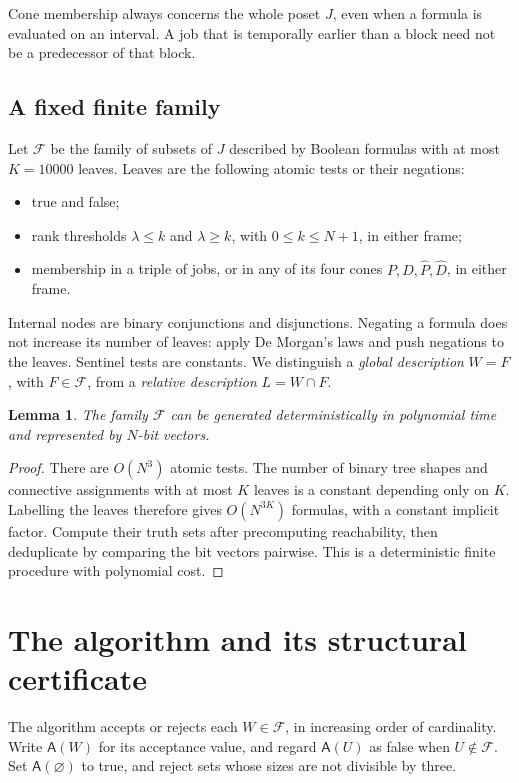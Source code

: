 \documentclass[11pt]{article}
\numberwithin{equation}{section}
\newtheorem{lemma}[theorem]{Lemma}
\theoremstyle{definition}
\theoremstyle{remark}
\newcommand{\F}{\mathcal F}
\newcommand{\rk}{\lambda}
\newcommand{\A}{\mathsf A}
\begin{document}
Cone membership always concerns the whole poset \(J\), even when a formula
is evaluated on an interval. A job that is temporally earlier than a block
need not be a predecessor of that block.

\subsection{A fixed finite family}

Let \(\F\) be the family of subsets of \(J\) described by Boolean formulas
with at most \(K=10000\) leaves. Leaves are the following atomic tests or
their negations:
\begin{itemize}
 \item true and false;
 \item rank thresholds \(\rk\le k\) and \(\rk\ge k\), with
 \(0\le k\le N+1\), in either frame;
 \item membership in a triple of jobs, or in any of its four cones
 \(P,D,\widehat P,\widehat D\), in either frame.
\end{itemize}
Internal nodes are binary conjunctions and disjunctions. Negating a formula
does not increase its number of leaves: apply De Morgan's laws and push
negations to the leaves. Sentinel tests are constants.
We distinguish a \emph{global description} \(W=F\), with \(F\in\F\),
from a \emph{relative description} \(L=W\cap F\).

\begin{lemma}\label{lem:family}
The family \(\F\) can be generated deterministically in polynomial time
and represented by \(N\)-bit vectors.
\end{lemma}
\begin{proof}
There are \(O(N^3)\) atomic tests. The number of binary tree shapes and
connective assignments with at most \(K\) leaves is a constant depending
only on \(K\). Labelling the leaves therefore gives \(O(N^{3K})\)
formulas, with a constant implicit factor. Compute their truth sets after
precomputing reachability, then deduplicate by comparing the bit vectors
pairwise. This is a deterministic finite procedure with polynomial cost.
\end{proof}

\section{The algorithm and its structural certificate}\label{sec:algorithm}

The algorithm accepts or rejects each \(W\in\F\), in increasing order
of cardinality. Write \(\A(W)\) for its acceptance value, and regard
\(\A(U)\) as false when \(U\notin\F\).
Set \(\A(\varnothing)\) to true, and reject sets whose sizes are not
divisible by three.
\end{document}
